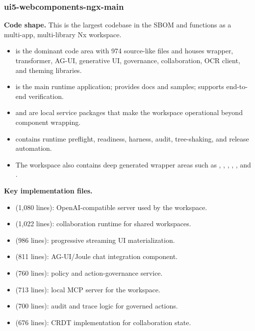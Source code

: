 \documentclass[11pt,a4paper]{article}
\begin{document}
\subsubsection{ui5-webcomponents-ngx-main}

\textbf{Code shape.} This is the largest codebase in the SBOM and functions as a multi-app, multi-library Nx workspace.
\begin{itemize}[leftmargin=*]
    \item {} is the dominant code area with 974 source-like files and houses wrapper, transformer, AG-UI, generative UI, governance, collaboration, OCR client, and theming libraries.
    \item {} is the main runtime application;  provides docs and samples;  supports end-to-end verification.
    \item {} and  are local service packages that make the workspace operational beyond component wrapping.
    \item {} contains runtime preflight, readiness, harness, audit, tree-shaking, and release automation.
    \item The workspace also contains deep generated wrapper areas such as , , , , , and .
\end{itemize}

\textbf{Key implementation files.}
\begin{itemize}[leftmargin=*]
    \item {} (1,080 lines): OpenAI-compatible server used by the workspace.
    \item {} (1,022 lines): collaboration runtime for shared workspaces.
    \item {} (986 lines): progressive streaming UI materialization.
    \item {} (811 lines): AG-UI/Joule chat integration component.
    \item {} (760 lines): policy and action-governance service.
    \item {} (713 lines): local MCP server for the workspace.
    \item {} (700 lines): audit and trace logic for governed actions.
    \item {} (676 lines): CRDT implementation for collaboration state.
\end{itemize}
\end{document}
